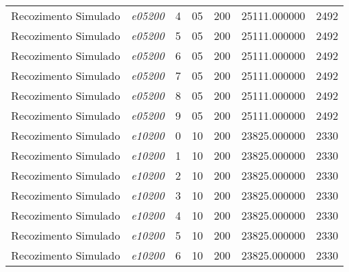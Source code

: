 {\begin{longtable}{cc|c|cc|cc}
			Recozimento Simulado & \textit{e05200}    & 4                               & 05               & 200              & 25111.000000                          & 2492 \\ 
			Recozimento Simulado & \textit{e05200}    & 5                               & 05               & 200              & 25111.000000                          & 2492 \\ 
			Recozimento Simulado & \textit{e05200}    & 6                               & 05               & 200              & 25111.000000                          & 2492 \\ 
			Recozimento Simulado & \textit{e05200}    & 7                               & 05               & 200              & 25111.000000                          & 2492 \\ 
			Recozimento Simulado & \textit{e05200}    & 8                               & 05               & 200              & 25111.000000                          & 2492 \\ 
			Recozimento Simulado & \textit{e05200}    & 9                               & 05               & 200              & 25111.000000                          & 2492 \\ \hline
			Recozimento Simulado & \textit{e10200}    & 0                               & 10               & 200              & 23825.000000                          & 2330 \\ 
			Recozimento Simulado & \textit{e10200}    & 1                               & 10               & 200              & 23825.000000                          & 2330 \\ 
			Recozimento Simulado & \textit{e10200}    & 2                               & 10               & 200              & 23825.000000                          & 2330 \\ 
			Recozimento Simulado & \textit{e10200}    & 3                               & 10               & 200              & 23825.000000                          & 2330 \\ 
			Recozimento Simulado & \textit{e10200}    & 4                               & 10               & 200              & 23825.000000                          & 2330 \\ 
			Recozimento Simulado & \textit{e10200}    & 5                               & 10               & 200              & 23825.000000                          & 2330 \\ 
			Recozimento Simulado & \textit{e10200}    & 6                               & 10               & 200              & 23825.000000                          & 2330 \\ 

\end{longtable}}
